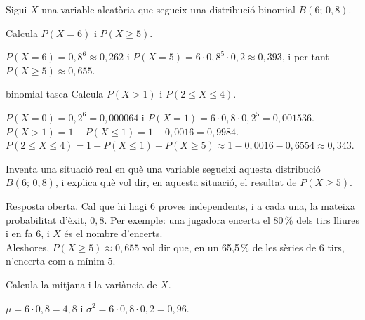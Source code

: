 Sigui $X$ una variable aleatòria que segueix una distribució binomial $B(6;\,0{,}8)$.

\begin{apartats}

Calcula $P(X=6)$ i $P(X\ge5)$.

\begin{solucio}
$P(X=6)=0{,}8^6\approx0{,}262$ i $P(X=5)=6\cdot0{,}8^5\cdot0{,}2\approx0{,}393$, i per tant
$P(X\ge5)\approx0{,}655$.
\end{solucio}

\begin{tria}{binomial-tasca}
Calcula $P(X>1)$ i $P(2\le X\le4)$.

\begin{solucio}
$P(X=0)=0{,}2^6=0{,}000064$ i $P(X=1)=6\cdot0{,}8\cdot0{,}2^5=0{,}001536$.\\
$P(X>1)=1-P(X\le1)=1-0{,}0016=0{,}9984$.\\
$P(2\le X\le4)=1-P(X\le1)-P(X\ge5)\approx1-0{,}0016-0{,}6554\approx0{,}343$.
\end{solucio}

Inventa una situació real en què una variable segueixi aquesta distribució $B(6;\,0{,}8)$, i explica què
vol dir, en aquesta situació, el resultat de $P(X\ge5)$.

\begin{solucio}
Resposta oberta. Cal que hi hagi 6 proves independents, i a cada una, la mateixa probabilitat d'èxit,
$0{,}8$. Per exemple: una jugadora encerta el 80\,\% dels tirs lliures i en fa 6, i $X$ és el nombre
d'encerts.\\
Aleshores, $P(X\ge5)\approx0{,}655$ vol dir que, en un 65,5\,\% de les sèries de 6 tirs, n'encerta com a
mínim 5.
\end{solucio}
\end{tria}

\begin{nomesllarg}
Calcula la mitjana i la variància de $X$.

\begin{solucio}
$\mu=6\cdot0{,}8=4{,}8$ i $\sigma^2=6\cdot0{,}8\cdot0{,}2=0{,}96$.
\end{solucio}
\end{nomesllarg}

\end{apartats}
